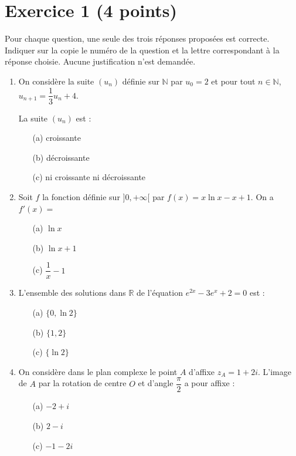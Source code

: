 \section*{Exercice 1 (4 points)}

Pour chaque question, une seule des trois réponses proposées est correcte.
Indiquer sur la copie le numéro de la question et la lettre correspondant à la réponse choisie.
Aucune justification n'est demandée.

\begin{enumerate}
\item On considère la suite $(u_n)$ définie sur $\mathbb{N}$ par $u_0 = 2$ et pour tout $n \in \mathbb{N}$,
$u_{n+1} = \dfrac{1}{3} u_n + 4$.

La suite $(u_n)$ est :
\begin{enumerate}
\item[(a)] croissante
\item[(b)] décroissante
\item[(c)] ni croissante ni décroissante
\end{enumerate}

\item Soit $f$ la fonction définie sur $]0, +\infty[$ par $f(x) = x \ln x - x + 1$.
On a $f'(x) = $
\begin{enumerate}
\item[(a)] $\ln x$
\item[(b)] $\ln x + 1$
\item[(c)] $\dfrac{1}{x} - 1$
\end{enumerate}

\item L'ensemble des solutions dans $\mathbb{R}$ de l'équation $e^{2x} - 3e^x + 2 = 0$ est :
\begin{enumerate}
\item[(a)] $\{0, \ln 2\}$
\item[(b)] $\{1, 2\}$
\item[(c)] $\{\ln 2\}$
\end{enumerate}

\item On considère dans le plan complexe le point $A$ d'affixe $z_A = 1 + 2i$.
L'image de $A$ par la rotation de centre $O$ et d'angle $\dfrac{\pi}{2}$ a pour affixe :
\begin{enumerate}
\item[(a)] $-2 + i$
\item[(b)] $2 - i$
\item[(c)] $-1 - 2i$
\end{enumerate}
\end{enumerate}
